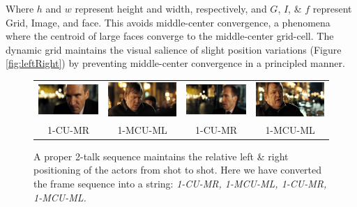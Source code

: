 Where $h$ and $w$ represent height and width, respectively, and $G$, $I$, \& $f$ represent Grid, Image, and face. This avoids middle-center convergence, a phenomena where the centroid of large faces converge to the middle-center grid-cell. The dynamic grid  maintains the visual salience of slight position variations (Figure \ref{fig:leftRight}) by preventing middle-center convergence in a principled manner. 
\begin{figure}
\begin{center}
\begin{tabular}{c c c c}
\includegraphics[width=0.22\linewidth]
  {fig/r1.jpg}
& \includegraphics[width=0.22\linewidth]
  {fig/l1.jpg}
& \includegraphics[width=0.22\linewidth]
  {fig/r2.jpg}
& \includegraphics[width=0.22\linewidth]
  {fig/l2.jpg}
\\
\large{1-CU-MR} & \large{1-MCU-ML} & \large{1-CU-MR} & \large{1-MCU-ML} \\
\end{tabular}
\end{center}
   \caption{A proper 2-talk sequence maintains the relative left \& right positioning of the actors from shot to shot. Here we have converted the frame sequence into a string: \textit{1-CU-MR, 1-MCU-ML, 1-CU-MR, 1-MCU-ML.}}
\label{fig:2talk}
\end{figure}


